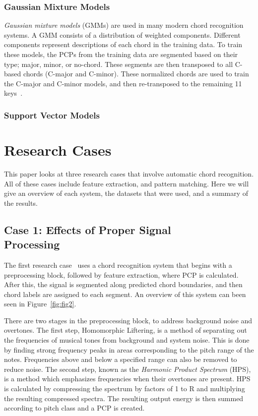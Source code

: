 \documentclass{sig-alternate}
\begin{document}
\subsubsection{Gaussian Mixture Models}

\textit{Gaussian mixture models} (GMMs) are used in many modern chord recognition systems. A GMM consists of a distribution of weighted components. Different components represent descriptions of each chord in the training data. To train these models, the PCPs from the training data are segmented based on their type; major, minor, or no-chord. These segments are then transposed to all C-based chords (C-major and C-minor). These normalized chords are used to train the C-major and C-minor models, and then re-transposed to the remaining 11 keys~\cite{TaeMin:2014}.


\subsubsection{Support Vector Models}


\section{Research Cases}

This paper looks at three research cases that involve automatic chord recognition. All of these cases include feature extraction, and pattern matching. Here we will give an overview of each system, the datasets that were used, and a summary of the results.

\subsection{Case 1: Effects of Proper Signal \\ Processing}

The first research case~\cite{Morman:2006} uses a chord recognition system that begins with a preprocessing block, followed by feature extraction, where PCP is calculated. After this, the signal is segmented along predicted chord boundaries, and then chord labels are assigned to each segment. An overview of this system can been seen in Figure~\ref{fig:fig2}. 

There are two stages in the preprocessing block, to address background noise and overtones. The first step, Homomorphic Liftering, is a method of separating out the frequencies of musical tones from background and system noise. This is done by finding strong frequency peaks in areas corresponding to the pitch range of the notes. Frequencies above and below a specified range can also be removed to reduce noise. The second step, known as the \textit{Harmonic Product Spectrum} (HPS), is a method which emphasizes frequencies when their overtones are present. HPS is calculated by compressing the spectrum by factors of 1 to R and multiplying the resulting compressed spectra. The resulting output energy is then summed according to pitch class and a PCP is created.
\end{document}
